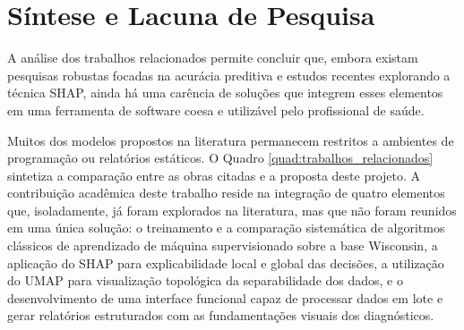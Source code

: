 \documentclass[
    12pt
    ,oneside
    ,a4paper
    ,chapter=TITLE
    ,section=TITLE
    ,sumario=abnt-6027-2012
    ,english,brazil]{abntex2} %
\begin{document}
\section{Síntese e Lacuna de Pesquisa}

\begingroup
\renewcommand{\floatpagefraction}{0.75}
\setcounter{totalnumber}{4}

A análise dos trabalhos relacionados permite concluir que, embora existam
pesquisas robustas focadas na acurácia preditiva e estudos recentes explorando
a técnica SHAP, ainda há uma carência de soluções que integrem esses elementos
em uma ferramenta de software coesa e utilizável pelo profissional de saúde.

Muitos dos modelos propostos na literatura permanecem restritos a ambientes
de programação ou relatórios estáticos. O Quadro \ref{quad:trabalhos_relacionados}
sintetiza a comparação entre as obras citadas e a proposta deste projeto.
A contribuição acadêmica deste trabalho reside na integração de quatro elementos
que, isoladamente, já foram explorados na literatura, mas que não foram reunidos
em uma única solução: o treinamento e a comparação sistemática de algoritmos
clássicos de aprendizado de máquina supervisionado sobre a base Wisconsin, a
aplicação do SHAP para explicabilidade local e global das decisões, a utilização
do UMAP para visualização topológica da separabilidade dos dados, e o
desenvolvimento de uma interface funcional capaz de processar dados em lote e
gerar relatórios estruturados com as fundamentações visuais dos diagnósticos.
\end{document}
